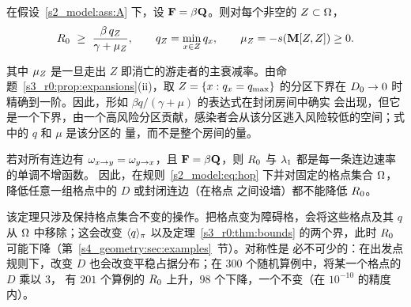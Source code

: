 \begin{proposition}[分区下界]\label{s3_r0:prop:zone}
  在假设~\ref{s2_model:ass:A} 下，设 $\mathbf{F}=\beta\mathbf{Q}$。则对每个非空的 $Z\subset\Omega$，
  \begin{equation}\label{s3_r0:eq:zone}
    R_0\ \ge\ \frac{\beta\,q_Z}{\gamma+\mu_Z},\qquad q_Z=\min_{x\in Z}q_x,\qquad \mu_Z=-s(\mathbf{M}[Z,Z])\ge0 .
  \end{equation}
\end{proposition}

其中 $\mu_Z$ 是一旦走出 $Z$ 即消亡的游走者的主衰减率。由命题~\ref{s3_r0:prop:expansions}(ii)，取
$Z=\{x:q_x=q_{\max}\}$ 的分区下界在 $D_0\to0$ 时精确到一阶。因此，形如 $\beta q/(\gamma+\mu)$ 的表达式在封闭房间中确实
会出现，但它是一个下界，由一个高风险分区贡献，感染者会从该分区逃入风险较低的空间；式中的 $q$ 和 $\mu$ 是该分区的
量，而不是整个房间的量。

\begin{theorem}\label{s3_r0:thm:edges}
  若对所有连边有 $\omega_{x\to y}=\omega_{y\to x}$，且 $\mathbf{F}=\beta\mathbf{Q}$，则 $R_0$ 与 $\lambda_1$ 都是每一条连边速率的单调不增函数。
  因此，在规则~\eqref{s2_model:eq:hop} 下并对固定的格点集合 $\Omega$，降低任意一组格点中的 $D$ 或封闭连边（在格点
  之间设墙）都不能降低 $R_0$。
\end{theorem}

该定理只涉及保持格点集合不变的操作。把格点变为障碍格，会将这些格点及其 $q$ 从 $\Omega$ 中移除；这会改变 $\langle q\rangle_{\pi}$
以及定理~\ref{s3_r0:thm:bounds} 的两个界，此时 $R_0$ 可能下降（第~\ref{s4_geometry:sec:examples}~节）。对称性是
必不可少的：在出发点规则下，改变 $D$ 也会改变平稳占据分布；在 $300$ 个随机算例中，将某一个格点的 $D$ 乘以 $3$，
有 $201$ 个算例的 $R_0$ 上升，$98$ 个下降，一个不变（在 $10^{-10}$ 的精度内）。

